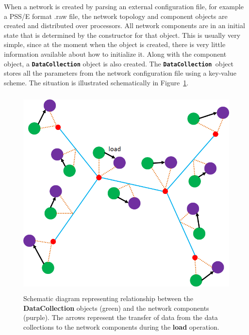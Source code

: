 \documentclass[12pt]{report} %
\begin{document}
When a network is created by parsing an external configuration file, for example a PSS/E format .raw file, the network topology and component objects are created and distributed over processors. All network components are in an initial state that is determined by the constructor for that object. This is usually very simple, since at the moment when the object is created, there is very little information available about how to initialize it. Along with the component object, a \texttt{\textbf{DataCollection}} object is also created. The \texttt{\textbf{DataCollection }}object stores all the parameters from the network configuration file using a key-value scheme. The situation is illustrated schematically in Figure~\ref{fig:fig-6}.

\begin{figure}
  \centering
    \includegraphics*[width=6.00in, height=4.24in, keepaspectratio=true]{Fig6-objects-network}
  \caption{Schematic diagram representing relationship between the \textbf{DataCollection} objects (green) and the network components (purple). The arrows represent the transfer of data from the data collections to the network components during the \textbf{load} operation.}
  \label{fig:fig-6}
\end{figure}


\end{document}
